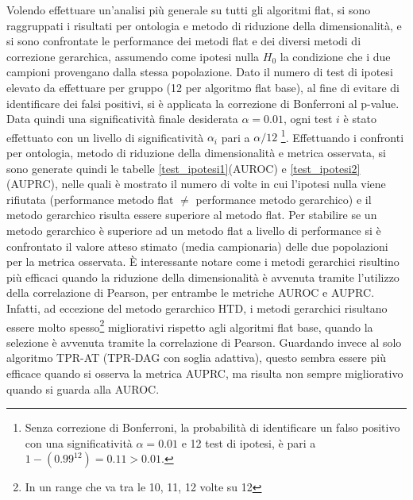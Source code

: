 \documentclass[12pt]{report}
\begin{document}
Volendo effettuare un'analisi più generale su tutti gli algoritmi flat, si sono raggruppati i risultati per ontologia e metodo di riduzione della dimensionalità, e si sono confrontate le performance dei metodi flat e dei diversi metodi di correzione gerarchica, assumendo come ipotesi nulla $H_0$ la condizione che i due campioni provengano dalla stessa popolazione.
\newline
\newline 
Dato il numero di test di ipotesi elevato da effettuare per gruppo (12 per algoritmo flat base), al fine di evitare di identificare dei falsi positivi,  si è applicata la correzione di Bonferroni\cite{bonferr} al p-value. Data quindi una significatività finale desiderata $\alpha=0.01$, ogni test $i$ è stato effettuato con un livello di significatività $\alpha_i$ pari a $\alpha/12$ \footnote{\footnotesize{Senza correzione di Bonferroni, la probabilità di identificare un falso positivo con una significatività $\alpha = 0.01$ e 12 test di ipotesi, è pari a $1-(0.99^{12}) = 0.11 > 0.01$.}}.
\newline
\newline
Effettuando i confronti per ontologia, metodo di riduzione della dimensionalità e metrica osservata, si sono generate quindi le tabelle \ref{test_ipotesi1}(AUROC) e \ref{test_ipotesi2}(AUPRC), nelle quali è mostrato il numero di volte in cui l'ipotesi nulla viene rifiutata (performance metodo flat $\neq$ performance metodo gerarchico) e il metodo gerarchico risulta essere superiore al metodo flat. Per stabilire se un metodo gerarchico è superiore ad un metodo flat a livello di performance si è confrontato il valore atteso stimato (media campionaria) delle due popolazioni per la metrica osservata. 
\newline
\newline
È interessante notare come i metodi gerarchici risultino più efficaci quando la riduzione della dimensionalità è avvenuta tramite l'utilizzo della correlazione di Pearson, per entrambe le metriche AUROC e AUPRC. Infatti, ad eccezione del metodo gerarchico HTD, i metodi gerarchici risultano essere molto spesso\footnote{\footnotesize{In un range che va tra le 10, 11, 12 volte su 12}} migliorativi rispetto agli algoritmi flat base, quando la selezione è avvenuta tramite la correlazione di Pearson. Guardando invece al solo algoritmo TPR-AT (TPR-DAG con soglia adattiva), questo sembra essere più efficace quando si osserva la metrica AUPRC, ma risulta non sempre migliorativo quando si guarda alla AUROC.
\end{document}
